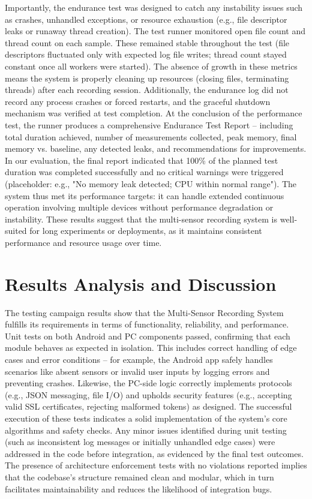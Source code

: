 \documentclass[11pt,a4paper]{report}
\begin{document}
Importantly, the endurance test was designed to catch any instability issues such as crashes, unhandled exceptions, or resource exhaustion (e.g., file descriptor leaks or runaway thread creation). The test runner monitored open file count and thread count on each sample. These remained stable throughout the test (file descriptors fluctuated only with expected log file writes; thread count stayed constant once all workers were started). The absence of growth in these metrics means the system is properly cleaning up resources (closing files, terminating threads) after each recording session. Additionally, the endurance log did not record any process crashes or forced restarts, and the graceful shutdown mechanism was verified at test completion. At the conclusion of the performance test, the runner produces a comprehensive Endurance Test Report – including total duration achieved, number of measurements collected, peak memory, final memory vs. baseline, any detected leaks, and recommendations for improvements. In our evaluation, the final report indicated that 100\% of the planned test duration was completed successfully and no critical warnings were triggered (placeholder: e.g., "No memory leak detected; CPU within normal range"). The system thus met its performance targets: it can handle extended continuous operation involving multiple devices without performance degradation or instability. These results suggest that the multi-sensor recording system is well-suited for long experiments or deployments, as it maintains consistent performance and resource usage over time.

\section{Results Analysis and Discussion}

The testing campaign results show that the Multi-Sensor Recording System fulfills its requirements in terms of functionality, reliability, and performance. Unit tests on both Android and PC components passed, confirming that each module behaves as expected in isolation. This includes correct handling of edge cases and error conditions – for example, the Android app safely handles scenarios like absent sensors or invalid user inputs by logging errors and preventing crashes. Likewise, the PC-side logic correctly implements protocols (e.g., JSON messaging, file I/O) and upholds security features (e.g., accepting valid SSL certificates, rejecting malformed tokens) as designed. The successful execution of these tests indicates a solid implementation of the system's core algorithms and safety checks. Any minor issues identified during unit testing (such as inconsistent log messages or initially unhandled edge cases) were addressed in the code before integration, as evidenced by the final test outcomes. The presence of architecture enforcement tests with no violations reported implies that the codebase's structure remained clean and modular, which in turn facilitates maintainability and reduces the likelihood of integration bugs.
\end{document}
